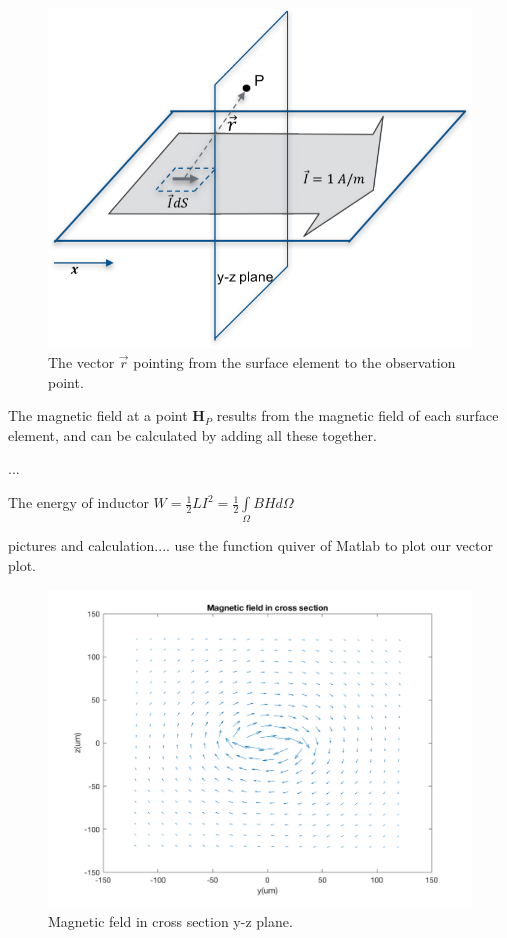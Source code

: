 \documentclass[11pt,final]{scrbook}
\begin{document}
 \begin{figure}[htbp]
\begin{center}
\includegraphics[scale=0.9]{TL_L(2).pdf}
\caption{The vector $\vec{ r } $ pointing from the surface element to the observation point.}
\label{fig:TL_L(2)}
\end{center}
\end{figure}
 
The magnetic field at a point $ \textbf{H}_{P}$ results from the magnetic field of each surface element, and can be calculated by adding all these together.
 
 ...
 
The energy of inductor $W=\frac{1}{2}LI^{2}=\frac{1}{2}\underset { \Omega  }{\int }{ B H  } d\Omega$

 pictures and calculation....
 use the function quiver of Matlab to plot our vector plot.
\begin{figure}[htbp]
\begin{center}
\includegraphics[scale=0.3]{TL_L.pdf}
\caption{Magnetic feld in cross section y-z plane.}
\label{fig:TL_L}
\end{center}
\end{figure}
\end{document}
